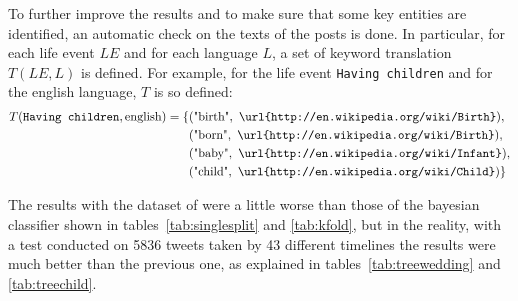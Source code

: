 To further improve the results and to make sure that some key entities are identified, an automatic check on the texts of the posts is done. In particular, for each life event $LE$ and for each language $L$, a set of keyword translation $T(LE, L)$ is defined. For example, for the life event \texttt{Having children} and for the english language, $T$ is so defined:
\begin{equation*}
\begin{split}
T(\text{\texttt{Having children}}, \text{english}) = \{&(\text{"birth"}, \text{ \texttt{\url{http://en.wikipedia.org/wiki/Birth}}}),\\&(\text{"born"}, \text{ \texttt{\url{http://en.wikipedia.org/wiki/Birth}}}),\\&(\text{"baby"}, \text{ \texttt{\url{http://en.wikipedia.org/wiki/Infant}}}),\\&(\text{"child"}, \text{ \texttt{\url{http://en.wikipedia.org/wiki/Child}}})\}
\end{split}
\end{equation*}

The results with the dataset of \cite{dickinson2015identifying} were a little worse than those of the bayesian classifier shown in tables~\ref{tab:singlesplit} and \ref{tab:kfold}, but in the reality, with a test conducted on 5836 tweets taken by 43 different timelines the results were much better than the previous one, as explained in tables~\ref{tab:treewedding} and \ref{tab:treechild}.

\begin{table}[htbp]
\centering
{}\qquad\qquad
{}
\caption{The performance of the decision tree with a very unbalanced dataset. On this same test set the previous classifier, the naive bayes, showed both precision and recall scores under 0.1.}
\end{table}

